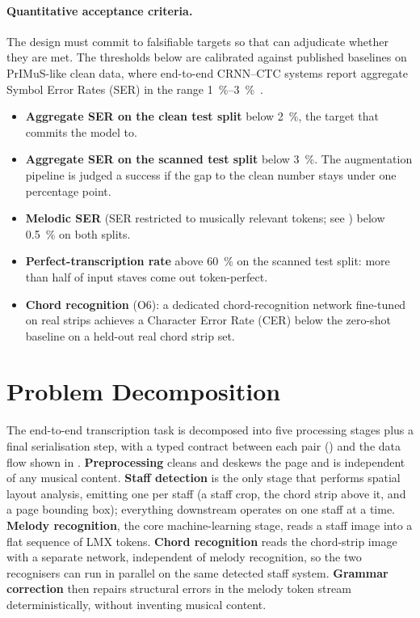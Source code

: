 \paragraph{Quantitative acceptance criteria.}
The design must commit to falsifiable targets so that 
can adjudicate whether they are met.
The thresholds below are calibrated against published baselines on
PrIMuS-like clean data, where end-to-end CRNN--CTC systems report
aggregate Symbol Error Rates (SER) in the
range \SIrange{1}{3}{\percent}~\cite{calvoZaragozaCameraPrimus2018,mayerPracticalEndToEnd2024}.

\begin{itemize}
    \item \textbf{Aggregate SER on the clean test split} below
          \SI{2}{\percent}, the target that
           commits the model to.
    \item \textbf{Aggregate SER on the scanned test split} below
          \SI{3}{\percent}. The augmentation pipeline is judged a
          success if the gap to the clean number stays under
          one percentage point.
    \item \textbf{Melodic SER} (SER restricted to musically
          relevant tokens; see ) below
          \SI{0.5}{\percent} on both splits.
    \item \textbf{Perfect-transcription rate} above \SI{60}{\percent}
          on the scanned test split: more than half of input staves
          come out token-perfect.
    \item \textbf{Chord recognition} (O6): a dedicated chord-recognition
          network fine-tuned on real strips achieves a Character Error
          Rate (CER) below the zero-shot baseline on a held-out real
          chord strip set.
\end{itemize}


\section{Problem Decomposition}
\label{sec:design-pipeline}

The end-to-end transcription task is decomposed into five processing
stages plus a final serialisation step, with a typed contract between
each pair () and the data flow shown in
.
\textbf{Preprocessing} cleans and deskews the page and is independent
of any musical content.
\textbf{Staff detection} is the only stage that performs spatial
layout analysis, emitting one  per staff (a staff crop,
the chord strip above it, and a page bounding box); everything
downstream operates on one staff at a time.
\textbf{Melody recognition}, the core machine-learning stage, reads a
staff image into a flat sequence of LMX tokens.
\textbf{Chord recognition} reads the chord-strip image with a separate
network, independent of melody recognition, so the two recognisers can
run in parallel on the same detected staff system.
\textbf{Grammar correction} then repairs structural errors in the
melody token stream deterministically, without inventing musical content.

